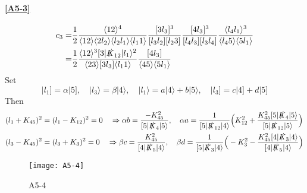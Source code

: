 \paragraph{\ref{A5-3}}
\begin{equation*}
\begin{split}
c_3 = &
\frac{1}{2}
\frac{\langle 12 \rangle^4}{\langle 12 \rangle\langle 2l_2 \rangle\langle l_2 l_1 \rangle\langle l_1 1 \rangle}
\frac{[3l_3]^3}{[l_3 l_2][l_2 3]}
\frac{[4 l_3]^3}{[l_4 l_3][l_3 l_4]}
\frac{\langle l_4 l_1 \rangle^3}{\langle l_4 5\rangle\langle 5 l_1 \rangle}
\\
= &
\frac{1}{2}\frac{\langle 12 \rangle^3 [3|\slashed{K}_{12}|l_1\rangle^2}{\langle 23 \rangle [ 3 l_3]\langle l_1 1\rangle}\frac{[4l_3]}{\langle 45\rangle\langle 5l_1\rangle}
\end{split}
\end{equation*}
Set
\begin{equation*}
|l_1] = \alpha|5] ,\quad
|l_3\rangle = \beta|4\rangle, \quad
|l_1\rangle = a |4\rangle + b|5\rangle ,\quad
|l_3] = c|4] + d|5] 
\end{equation*}
Then
\begin{equation*}
\begin{split}
& (l_1 + K_{45})^2 = (l_1 - K_{12})^2 = 0 \quad\Rightarrow
\alpha b = \frac{-K_{45}^2}{[5|\slashed{K}_4|5\rangle} ,\quad
\alpha a = \frac{1}{[5|\slashed{K}_{12}|4\rangle}\Big(K_{12}^2 + \frac{K_{45}^2[5|\slashed{K}_4|5\rangle}{[5|\slashed{K}_{12}|5\rangle}\Big)
\\
& (l_3 -K_{45})^2 = (l_3 + K_3)^2 = 0 \quad\Rightarrow
\beta c =\frac{K_{45}^2}{[4|\slashed{K}_5|4\rangle} ,\quad
\beta d = \frac{1}{[5|\slashed{K}_3|4\rangle}\Big( -K_3^2 - \frac{K_{45}^2[4|\slashed{K}_3|4\rangle}{[4|\slashed{K}_5|4\rangle}\Big)
\end{split}
\end{equation*}
%
%
\begin{figure}
  \centering
    \texttt{[image: A5-4]}
    \caption{A5-4}
  \label{A5-4}
\end{figure}

